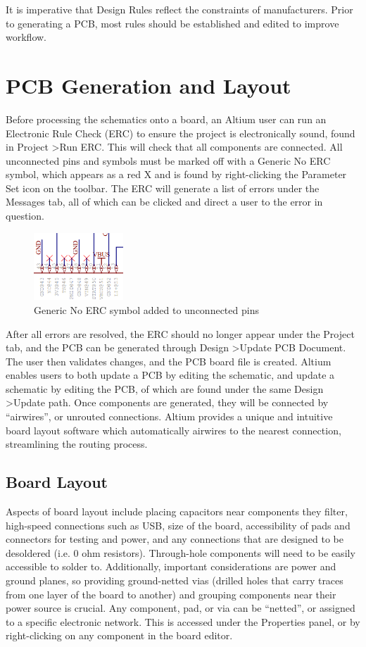 \documentclass[twocolumn]{article}
\begin{document}
It is imperative that Design Rules reflect the constraints of manufacturers. Prior to generating a PCB, most rules should be established and edited to improve workflow. 

\section{PCB Generation and Layout}

Before processing the schematics onto a board, an Altium user can run an Electronic Rule Check (ERC) to ensure the project is electronically sound, found in Project \textgreater Run ERC. This will check that all components are connected. All unconnected pins and symbols must be marked off with a Generic No ERC symbol, which appears as a red X and is found by right-clicking the Parameter Set icon on the toolbar. The ERC will generate a list of errors under the Messages tab, all of which can be clicked and direct a user to the error in question. 

\begin{figure}[h]
    \centering
    \includegraphics[width=0.3\textwidth]{noERC.png}
    \caption{Generic No ERC symbol added to unconnected pins}
    \label{fig:No-ERC}
\end{figure}

After all errors are resolved, the ERC should no longer appear under the Project tab, and the PCB can be generated through Design \textgreater Update PCB Document. The user then validates changes, and the PCB board file is created. Altium enables users to both update a PCB by editing the schematic, and update a schematic by editing the PCB, of which are found under the same Design \textgreater Update path. Once components are generated, they will be connected by “airwires”, or unrouted connections. Altium provides a unique and intuitive board layout software which automatically airwires to the nearest connection, streamlining the routing process. 

\subsection{Board Layout}
Aspects of board layout include placing capacitors near components they filter, high-speed connections such as USB, size of the board, accessibility of pads and connectors for testing and power, and any connections that are designed to be desoldered (i.e. 0 ohm resistors). Through-hole components will need to be easily accessible to solder to. Additionally, important considerations are power and ground planes, so providing ground-netted vias (drilled holes that carry traces from one layer of the board to another) and grouping components near their power source is crucial. Any component, pad, or via can be “netted”, or assigned to a specific electronic network. This is accessed under the Properties panel, or by right-clicking on any component in the board editor. 
\end{document}
